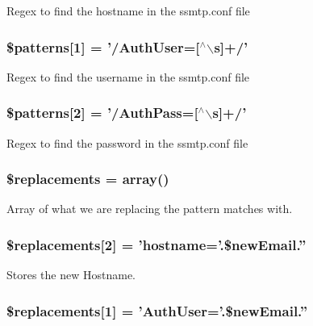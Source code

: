 \-Regex to find the hostname in the ssmtp.\-conf file \hypertarget{changeEmail_8php_ae31d13193d3c853d71ef3f7abfd40194}{
\subsubsection[{\$patterns}]{\setlength{\rightskip}{0pt plus 5cm}\$patterns\mbox{[}1\mbox{]} = '/\-Auth\-User=\mbox{[}$^\wedge$$\backslash$s\mbox{]}+/'}}\label{changeEmail_8php_ae31d13193d3c853d71ef3f7abfd40194}
\-Regex to find the username in the ssmtp.\-conf file \hypertarget{changeEmail_8php_a8a5a9dd58c17ede53c8a33a619568a3c}{
\subsubsection[{\$patterns}]{\setlength{\rightskip}{0pt plus 5cm}\$patterns\mbox{[}2\mbox{]} = '/\-Auth\-Pass=\mbox{[}$^\wedge$$\backslash$s\mbox{]}+/'}}\label{changeEmail_8php_a8a5a9dd58c17ede53c8a33a619568a3c}
\-Regex to find the password in the ssmtp.\-conf file \hypertarget{changeEmail_8php_a93cb3f67ace379a71de4fb00bcc7a605}{
\subsubsection[{\$replacements}]{\setlength{\rightskip}{0pt plus 5cm}\$replacements = array()}}\label{changeEmail_8php_a93cb3f67ace379a71de4fb00bcc7a605}
\-Array of what we are replacing the pattern matches with. \hypertarget{changeEmail_8php_a46ef0ff9b63f39252dc8d8ffe01fe186}{
\subsubsection[{\$replacements}]{\setlength{\rightskip}{0pt plus 5cm}\$replacements\mbox{[}2\mbox{]} = 'hostname='.\$new\-Email.''}}\label{changeEmail_8php_a46ef0ff9b63f39252dc8d8ffe01fe186}
\-Stores the new \-Hostname. \hypertarget{changeEmail_8php_a41cab20bd9e089d68362e6b9489510a8}{
\subsubsection[{\$replacements}]{\setlength{\rightskip}{0pt plus 5cm}\$replacements\mbox{[}1\mbox{]} = '\-Auth\-User='.\$new\-Email.''}}\label{changeEmail_8php_a41cab20bd9e089d68362e6b9489510a8}
